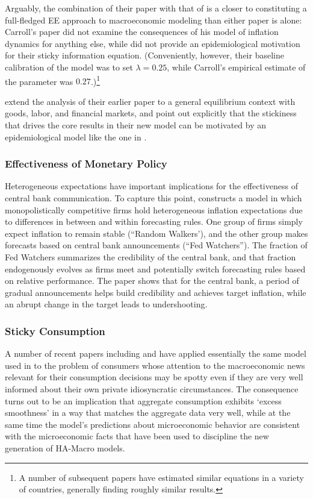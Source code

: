 Arguably, the combination of their paper with that of \cite{carroll2003macroeconomic} is a closer to constituting a full-fledged EE approach to macroeconomic modeling than either paper is alone: Carroll's paper did not examine the consequences of his model of inflation dynamics for anything else, while \cite{mr2002Sticky} did not provide an epidemiological motivation for their sticky information equation.  (Conveniently, however, their baseline calibration of the model was to set $\lambda=0.25$, while Carroll's empirical estimate of the parameter was $0.27$.)\footnote{A number of subsequent papers have estimated similar equations in a variety of countries, generally finding roughly similar results.}

\cite{mankiw2007sticky} extend the analysis of their earlier paper to a general equilibrium context with goods, labor, and financial markets, and point out explicitly that the stickiness that drives the core results in their new model can be motivated by an epidemiological model like the one in \cite{carroll2003macroeconomic}.

\subsubsection{Effectiveness of Monetary Policy}

Heterogeneous expectations have important implications for the effectiveness of central bank communication.   To capture this point, \cite{hachem_inflation_2017} constructs a model in which monopolistically competitive firms hold heterogeneous inflation expectations due to differences in between and within forecasting rules. One group of firms simply expect inflation to remain stable (``Random Walkers'), and the other group makes forecasts based on central bank announcements (``Fed Watchers''). The fraction of Fed Watchers summarizes the credibility of the central bank, and that fraction endogenously evolves as firms meet and potentially switch forecasting rules based on relative performance. The paper shows that for the central bank, a period of gradual announcements helps build credibility and achieves target inflation, while an abrupt change in the target leads to undershooting.

\subsubsection{Sticky Consumption}

A number of recent papers including \cite{carroll2020sticky} and \cite{auclert2020micro} have applied essentially the same model used in \cite{carroll2003macroeconomic} to the problem of consumers whose attention to the macroeconomic news relevant for their consumption decisions may be spotty even if they are very well informed about their own private idiosyncratic circumstances.  The consequence turns out to be an implication that aggregate consumption exhibits `excess smoothness' in a way that matches the aggregate data very well, while at the same time the model's predictions about microeconomic behavior are consistent with the microeconomic facts that have been used to discipline the new generation of HA-Macro models.

